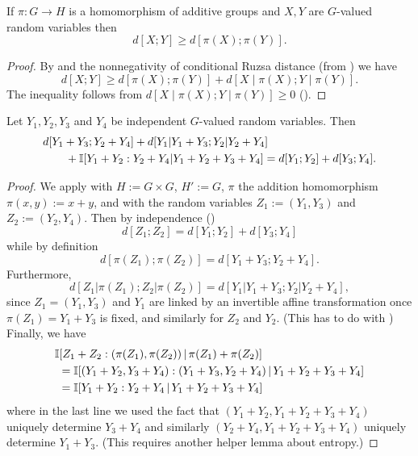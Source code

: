 \begin{corollary}\label{fibring-ineq}
  \leanok
If $\pi:G\to H$ is a homomorphism of additive groups and $X,Y$ are $G$-valued random variables then
\[d[X;Y]\geq d[\pi(X);\pi(Y)].\]
\end{corollary}

\begin{proof}
\leanok
By  and the nonnegativity of conditional Ruzsa distance (from ) we have
\[d[X;Y]\geq d[\pi(X);\pi(Y)]+d[X\mid \pi(X);Y\mid \pi(Y)].\]
The inequality follows from $d[X\mid \pi(X);Y\mid \pi(Y)]\geq 0$ ().
\end{proof}


\begin{corollary}\label{cor-fibre}
  \leanok
  Let $Y_1,Y_2,Y_3$ and $Y_4$ be independent $G$-valued random variables.
  Then
\begin{align*}
  & d[Y_1+Y_3; Y_2+Y_4] + d[Y_1|Y_1+Y_3; Y_2|Y_2+Y_4] \\
  &\qquad + \mathbb{I}[Y_1+Y_2 : Y_2 + Y_4 | Y_1+Y_2+Y_3+Y_4] = d[Y_1; Y_2] + d[Y_3; Y_4].
\end{align*}
\end{corollary}

\begin{proof}
  \leanok
  We apply  with $H := G \times G$, $H' := G$, $\pi$ the addition homomorphism $\pi(x,y) := x+y$, and with the random variables $Z_1 := (Y_1,Y_3)$ and $Z_2 := (Y_2,Y_4)$.  Then by independence ()
\[
  d[Z_1; Z_2] = d[Y_1; Y_2] + d[Y_3; Y_4]
\]
while by definition
\[
  d[\pi(Z_1); \pi(Z_2)] = d[Y_1+Y_3; Y_2+Y_4].
\]
Furthermore,
\[
  d[Z_1|\pi(Z_1); Z_2|\pi(Z_2)] = d[Y_1|Y_1+Y_3;Y_2|Y_2+Y_4],
\]
since $Z_1=(Y_1,Y_3)$ and $Y_1$ are linked by an invertible affine transformation once $\pi(Z_1)=Y_1+Y_3$ is fixed, and similarly for $Z_2$ and $Y_2$.  (This has to do with )
Finally, we have
\begin{align*}
  &\mathbb{I}[Z_1 + Z_2 : (\pi(Z_1),\pi(Z_2)) \,|\, \pi(Z_1) + \pi(Z_2)] \\
  &\ = \mathbb{I}[(Y_1+Y_2, Y_3+Y_4) : (Y_1+Y_3, Y_2+Y_4) \,|\, Y_1+Y_2+Y_3+Y_4] \\
  &\ = \mathbb{I}[Y_1+Y_2 : Y_2+Y_4 \,|\, Y_1+Y_2+Y_3+Y_4]
\end{align*}
where in the last line we used the fact that $(Y_1+Y_2, Y_1+Y_2+Y_3+Y_4)$ uniquely determine $Y_3+Y_4$ and similarly
$(Y_2+Y_4, Y_1+Y_2+Y_3+Y_4)$ uniquely determine $Y_1+Y_3$.  (This requires another helper lemma about entropy.)
\end{proof}
